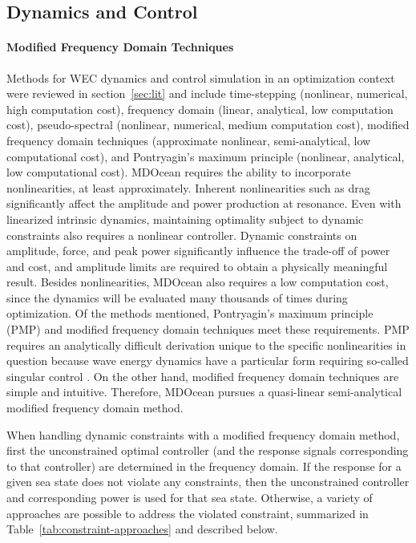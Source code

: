 

\subsection{Dynamics and Control}\label{sec:dynamics}
\paragraph{Modified Frequency Domain Techniques}
Methods for WEC dynamics and control simulation in an optimization context were reviewed in section~\ref{sec:lit} and include time-stepping (nonlinear, numerical, high computation cost), frequency domain (linear, analytical, low computation cost), pseudo-spectral (nonlinear, numerical, medium computation cost), modified frequency domain techniques (approximate nonlinear, semi-analytical, low computational cost), and Pontryagin's maximum principle (nonlinear, analytical, low computational cost).
MDOcean requires the ability to incorporate nonlinearities, at least approximately.
Inherent nonlinearities such as drag significantly affect the amplitude and power production at resonance.
Even with linearized intrinsic dynamics, maintaining optimality subject to dynamic constraints also requires a nonlinear controller.
Dynamic constraints on amplitude, force, and peak power significantly influence the trade-off of power and cost, and amplitude limits are required to obtain a physically meaningful result.
Besides nonlinearities, MDOcean also requires a low computation cost, since the dynamics will be evaluated many thousands of times during optimization.
Of the methods mentioned, Pontryagin's maximum principle (PMP) and modified frequency domain techniques meet these requirements.
PMP requires an analytically difficult derivation unique to the specific nonlinearities in question because wave energy dynamics have a particular form requiring so-called singular control \cite{zou_optimal_2017}.
On the other hand, modified frequency domain techniques are simple and intuitive.
Therefore, MDOcean pursues a quasi-linear semi-analytical modified frequency domain method.

When handling dynamic constraints with a modified frequency domain method, first the unconstrained optimal controller (and the response signals corresponding to that controller) are determined in the frequency domain.
If the response for a given sea state does not violate any constraints, then the unconstrained controller and corresponding power is used for that sea state.
Otherwise, a variety of approaches are possible to address the violated constraint, summarized in Table~\ref{tab:constraint-approaches} and described below. 

